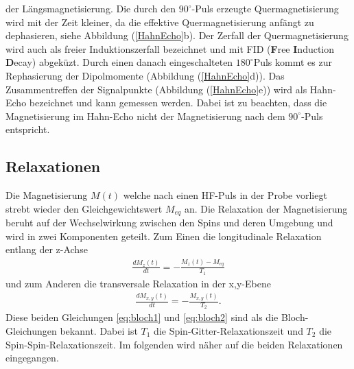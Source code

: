 der L\"{a}ngsmagnetisierung.
Die durch den $90^{\circ}$-Puls erzeugte Quermagnetisierung wird mit der Zeit kleiner, da die effektive Quermagnetisierung anf\"{a}ngt zu dephasieren, siehe Abbildung (\ref{HahnEcho}b).
Der Zerfall der Quermagnetisierung wird auch als freier Induktionszerfall bezeichnet und mit FID (\textbf{F}ree \textbf{I}nduction \textbf{D}ecay) abgek\"{u}zt.
Durch einen danach eingeschalteten $180^{\circ}${\-}Puls kommt es zur Rephasierung der Dipol{\-}mo{\-}men{\-}te (Abbildung (\ref{HahnEcho}d)).
Das Zusam{\-}men{\-}tref{\-}fen der Signalpunkte (Abbildung (\ref{HahnEcho}e)) wird als Hahn-Echo bezeichnet und kann gemessen werden.
Dabei ist zu beachten, dass die Magnetisierung im Hahn-Echo nicht der Magnetisierung nach dem $90^{\circ}$-Puls entspricht.

\subsection{Relaxationen}
Die Magnetisierung $M(t)$ welche nach einen HF-Puls in der Probe vorliegt strebt wieder den Gleichgewichtswert $M_{eq}$ an.
Die Relaxation der Magnetisierung beruht auf der Wechselwirkung zwischen den Spins und deren Umgebung und wird in zwei Komponenten geteilt.
Zum Einen die longitudinale Relaxation entlang der z-Achse
\begin{align}
	\frac{d M_z(t)}{d t} = - \frac{M_z(t) - M_{eq}}{T_1} 
	\label{eq:bloch1}
\end{align}
und zum Anderen die transversale Relaxation in der x,y-Ebene
\begin{align}
	\frac{d M_{x,y}(t)}{d t} = - \frac{M_{x,y}(t)}{T_2}. 
	\label{eq:bloch2}
\end{align}
Diese beiden Gleichungen \eqref{eq:bloch1} und \eqref{eq:bloch2} sind als die Bloch-Gleichungen bekannt.
Dabei ist $T_1$ die Spin-Gitter-Relaxationszeit und $T_2$ die Spin-Spin-Relaxationszeit.
Im folgenden wird n\"{a}her auf die beiden Relaxationen eingegangen.

